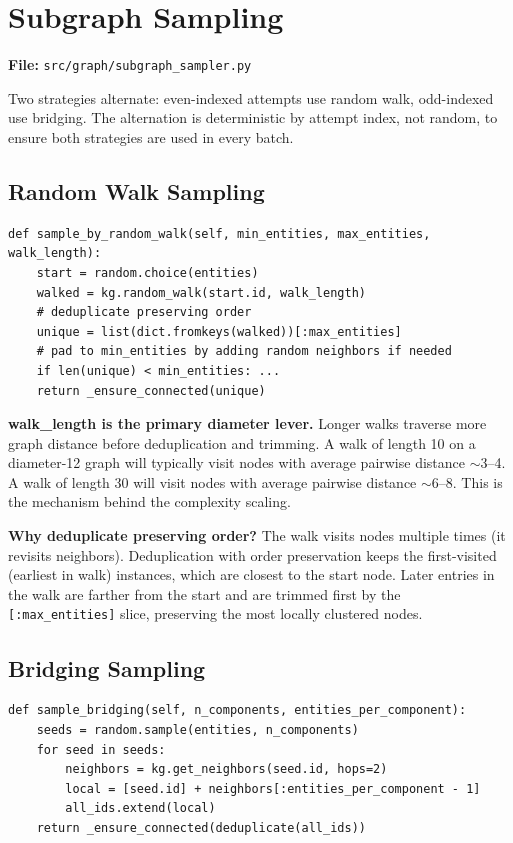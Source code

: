 \documentclass[11pt,a4paper]{article}
\begin{document}
\section{Subgraph Sampling}
\label{sec:sampling}

\textbf{File:} \texttt{src/graph/subgraph\_sampler.py}

Two strategies alternate: even-indexed attempts use random walk, odd-indexed use bridging. The alternation is deterministic by attempt index, not random, to ensure both strategies are used in every batch.

\subsection{Random Walk Sampling}

\begin{lstlisting}[style=py]
def sample_by_random_walk(self, min_entities, max_entities, walk_length):
    start = random.choice(entities)
    walked = kg.random_walk(start.id, walk_length)
    # deduplicate preserving order
    unique = list(dict.fromkeys(walked))[:max_entities]
    # pad to min_entities by adding random neighbors if needed
    if len(unique) < min_entities: ...
    return _ensure_connected(unique)
\end{lstlisting}

\textbf{walk\_length is the primary diameter lever.} Longer walks traverse more graph distance before deduplication and trimming. A walk of length 10 on a diameter-12 graph will typically visit nodes with average pairwise distance $\sim$3--4. A walk of length 30 will visit nodes with average pairwise distance $\sim$6--8. This is the mechanism behind the complexity scaling.

\textbf{Why deduplicate preserving order?} The walk visits nodes multiple times (it revisits neighbors). Deduplication with order preservation keeps the first-visited (earliest in walk) instances, which are closest to the start node. Later entries in the walk are farther from the start and are trimmed first by the \texttt{[:max\_entities]} slice, preserving the most locally clustered nodes.

\subsection{Bridging Sampling}

\begin{lstlisting}[style=py]
def sample_bridging(self, n_components, entities_per_component):
    seeds = random.sample(entities, n_components)
    for seed in seeds:
        neighbors = kg.get_neighbors(seed.id, hops=2)
        local = [seed.id] + neighbors[:entities_per_component - 1]
        all_ids.extend(local)
    return _ensure_connected(deduplicate(all_ids))
\end{lstlisting}
\end{document}
